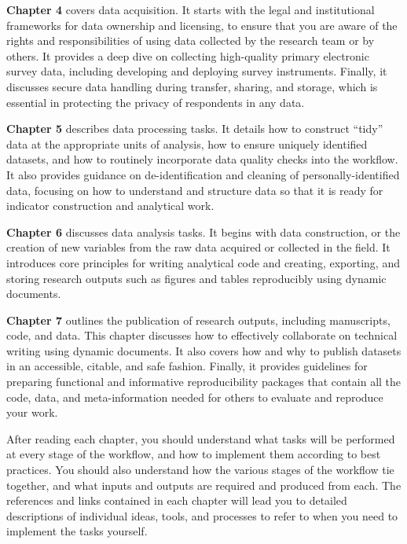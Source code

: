 \textbf{Chapter 4} covers data acquisition. It starts with
the legal and institutional frameworks for data ownership and licensing,
to ensure that you are aware of the rights and responsibilities
of using data collected by the research team or by others.
It provides a deep dive on collecting high-quality primary electronic survey data,
including developing and deploying survey instruments.
Finally, it discusses secure data handling during transfer, sharing, and storage,
which is essential in protecting the privacy of respondents in any data.

\textbf{Chapter 5} describes data processing tasks.
It details how to construct ``tidy'' data at the appropriate units of analysis,
how to ensure uniquely identified datasets, and
how to routinely incorporate data quality checks into the workflow.
It also provides guidance on de-identification and cleaning of personally-identified data,
focusing on how to understand and structure data
so that it is ready for indicator construction and analytical work.

\textbf{Chapter 6} discusses data analysis tasks.
It begins with data construction, or the creation of new variables
from the raw data acquired or collected in the field.
It introduces core principles for writing analytical code
and creating, exporting, and storing research outputs
such as figures and tables reproducibly using dynamic documents.

\textbf{Chapter 7} outlines the publication of research outputs,
including manuscripts, code, and data.
This chapter discusses
how to effectively collaborate on technical writing
using dynamic documents.
It also covers how and why to publish datasets
in an accessible, citable, and safe fashion.
Finally, it provides guidelines for preparing
functional and informative reproducibility packages
that contain all the code, data, and meta-information needed
for others to evaluate and reproduce your work.

After reading each chapter, you should understand
what tasks will be performed at every stage of the workflow,
and how to implement them according to best practices.
You should also understand how the various stages of the workflow tie together,
and what inputs and outputs are required and produced from each.
The references and links contained in each chapter
will lead you to detailed descriptions of individual
ideas, tools, and processes to refer to when you need to implement the tasks yourself.


